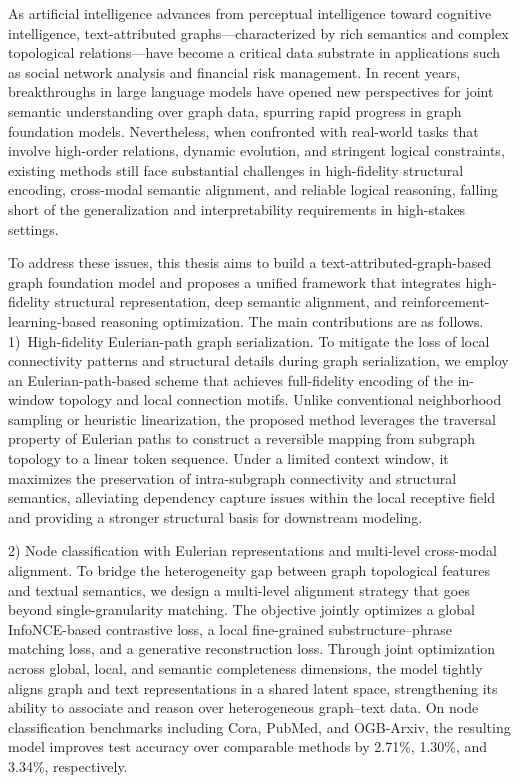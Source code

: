 
\begin{eabstract}
As artificial intelligence advances from perceptual intelligence toward cognitive intelligence, text-attributed graphs—characterized by rich semantics and complex topological relations—have become a critical data substrate in applications such as social network analysis and financial risk management. In recent years, breakthroughs in large language models have opened new perspectives for joint semantic understanding over graph data, spurring rapid progress in graph foundation models. Nevertheless, when confronted with real-world tasks that involve high-order relations, dynamic evolution, and stringent logical constraints, existing methods still face substantial challenges in high-fidelity structural encoding, cross-modal semantic alignment, and reliable logical reasoning, falling short of the generalization and interpretability requirements in high-stakes settings.

To address these issues, this thesis aims to build a text-attributed-graph-based graph foundation model and proposes a unified framework that integrates high-fidelity structural representation, deep semantic alignment, and reinforcement-learning-based reasoning optimization. The main contributions are as follows.
1)\ {High-fidelity Eulerian-path graph serialization.}
To mitigate the loss of local connectivity patterns and structural details during graph serialization, we employ an Eulerian-path-based scheme that achieves full-fidelity encoding of the in-window topology and local connection motifs. Unlike conventional neighborhood sampling or heuristic linearization, the proposed method leverages the traversal property of Eulerian paths to construct a reversible mapping from subgraph topology to a linear token sequence. Under a limited context window, it maximizes the preservation of intra-subgraph connectivity and structural semantics, alleviating dependency capture issues within the local receptive field and providing a stronger structural basis for downstream modeling.

2) Node classification with Eulerian representations and multi-level cross-modal alignment. 
To bridge the heterogeneity gap between graph topological features and textual semantics, we design a multi-level alignment strategy that goes beyond single-granularity matching. The objective jointly optimizes a global InfoNCE-based contrastive loss, a local fine-grained substructure–phrase matching loss, and a generative reconstruction loss. Through joint optimization across global, local, and semantic completeness dimensions, the model tightly aligns graph and text representations in a shared latent space, strengthening its ability to associate and reason over heterogeneous graph–text data. On node classification benchmarks including Cora, PubMed, and OGB-Arxiv, the resulting model improves test accuracy over comparable methods by 2.71\%, 1.30\%, and 3.34\%, respectively.


\end{eabstract}
